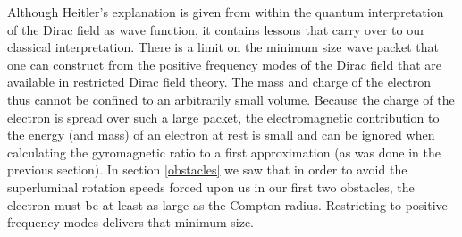 \documentclass[onecolumn,secnumarabic,amsmath,amssymb,balancelastpage,nofootinbib]{article}
\begin{document}
Although Heitler's explanation is given from within the quantum interpretation of the Dirac field as wave function, it contains lessons that carry over to our classical interpretation.  There is a limit on the minimum size wave packet that one can construct from the positive frequency modes of the Dirac field that are available in restricted Dirac field theory.  The mass and charge of the electron thus cannot be confined to an arbitrarily small volume.  Because the charge of the electron is spread over such a large packet, the electromagnetic contribution to the energy (and mass) of an electron at rest is small and can be ignored when calculating the gyromagnetic ratio to a first approximation (as was done in the previous section).  In section \ref{obstacles} we saw that in order to avoid the superluminal rotation speeds forced upon us in our first two obstacles, the electron must be at least as large as the Compton radius.  Restricting to positive frequency modes delivers that minimum size.
\end{document}
